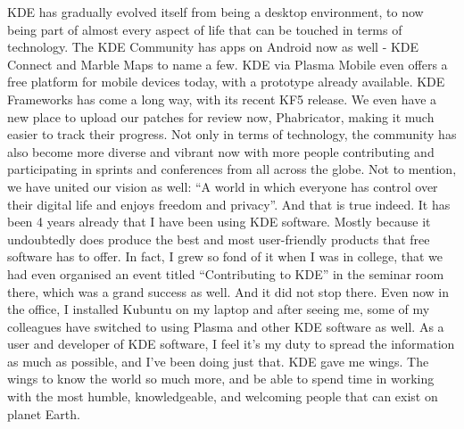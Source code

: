 KDE has gradually evolved itself from being a desktop environment, to now being part of almost every aspect of life that can be touched in terms of technology. The KDE Community has apps on Android now as well - KDE Connect and Marble Maps to name a few. KDE via Plasma Mobile even offers a free platform for mobile devices today, with a prototype already available. KDE Frameworks has come a long way, with its recent KF5 release. We even have a new place to upload our patches for review now, Phabricator, making it much easier to track their progress.  Not only in terms of technology, the community has also become more diverse and vibrant now with more people contributing and participating in sprints and conferences from all across the globe. Not to mention, we have united our vision as well: “A world in which everyone has control over their digital life and enjoys freedom and privacy”. And that is true indeed. It has been 4 years already that I have been using KDE software. Mostly because it undoubtedly does produce the best and most user-friendly products that free software has to offer. In fact, I grew so fond of it when I was in college, that we had even organised an event titled “Contributing to KDE” in the seminar room there, which was a grand success as well. And it did not stop there. Even now in the office, I installed Kubuntu on my laptop and after seeing me, some of my colleagues have switched to using Plasma and other KDE software as well. As a user and developer of KDE software, I feel it's my duty to spread the information as much as possible, and I've been doing just that. KDE gave me wings. The wings to know the world so much more, and be able to spend time in working with the most humble, knowledgeable, and welcoming people that can exist on planet Earth. 


